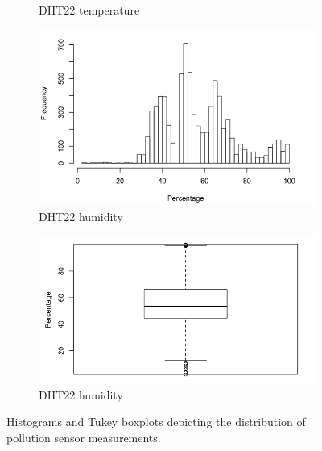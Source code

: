 \documentclass[11pt]{report}
\begin{document}
\begin{figure}[!tbp]
\begin{minipage}{1\linewidth}
\begin{subfigure}[t]{.4\linewidth}
            	\caption{DHT22 temperature}
            	\label{fig:temp_boxplot}
	   \end{subfigure}
        \end{minipage}
    \begin{minipage}{1\linewidth}
            \begin{subfigure}[t]{.4\linewidth}
                \includegraphics[width=\textwidth]{images/humidity_histogram}
                \caption{DHT22 humidity}
                \label{fig:humidity_histogram}
            \end{subfigure}
            \hfill
            \begin{subfigure}[t]{.4\linewidth}
            	\includegraphics[width=\textwidth]{images/humidity_boxplot}
            	\caption{DHT22 humidity}
            	\label{fig:humidity_boxplot}
	   \end{subfigure}
        \end{minipage}
    \caption[Sensor measurement histograms and boxplots.]{Histograms and Tukey boxplots depicting the distribution of pollution sensor measurements.}
    \label{fig:histograms_and_boxplots}
\end{figure}
\end{document}
